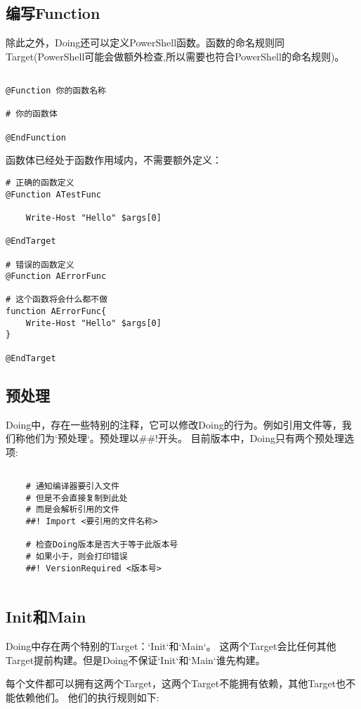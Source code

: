\subsection{编写Function}
除此之外，Doing还可以定义PowerShell函数。函数的命名规则同Target(PowerShell可能会做额外检查,所以需要也符合PowerShell的命名规则)。
\begin{lstlisting}

@Function 你的函数名称

# 你的函数体

@EndFunction

\end{lstlisting}
函数体已经处于函数作用域内，不需要额外定义：
\begin{lstlisting}
# 正确的函数定义
@Function ATestFunc
	
	Write-Host "Hello" $args[0]
	
@EndTarget

# 错误的函数定义
@Function AErrorFunc

# 这个函数将会什么都不做
function AErrorFunc{
	Write-Host "Hello" $args[0]
}

@EndTarget

\end{lstlisting}


\subsection{预处理}
Doing中，存在一些特别的注释，它可以修改Doing的行为。例如引用文件等，我们称他们为`预处理`。预处理以\#{}\#{}!开头。
目前版本中，Doing只有两个预处理选项:
\begin{lstlisting}
	
	# 通知编译器要引入文件
	# 但是不会直接复制到此处
	# 而是会解析引用的文件
	##! Import <要引用的文件名称>
	
	# 检查Doing版本是否大于等于此版本号
	# 如果小于，则会打印错误
	##! VersionRequired <版本号>
	

\end{lstlisting}



\subsection{Init和Main}
Doing中存在两个特别的Target：`Init`和`Main`。
这两个Target会比任何其他Target提前构建。但是Doing不保证`Init`和`Main`谁先构建。

\newline{}
每个文件都可以拥有这两个Target，这两个Target不能拥有依赖，其他Target也不能依赖他们。
他们的执行规则如下:

